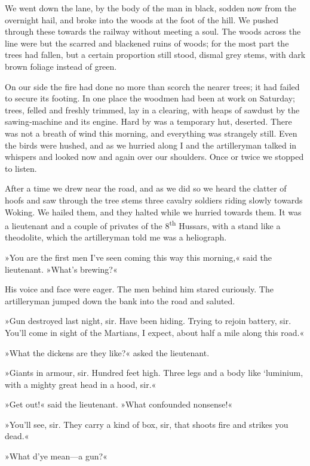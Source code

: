 We went down the lane, by the body of the man in black, sodden now from the overnight hail, and broke into the woods at the foot of the hill. We pushed through these towards the railway without meeting a soul. The woods across the line were but the scarred and blackened ruins of woods; for the most part the trees had fallen, but a certain proportion still stood, dismal grey stems, with dark brown foliage instead of green.

On our side the fire had done no more than scorch the nearer trees; it had failed to secure its footing. In one place the woodmen had been at work on Saturday; trees, felled and freshly trimmed, lay in a clearing, with heaps of sawdust by the sawing-machine and its engine. Hard by was a temporary hut, deserted. There was not a breath of wind this morning, and everything was strangely still. Even the birds were hushed, and as we hurried along I and the artilleryman talked in whispers and looked now and again over our shoulders. Once or twice we stopped to listen.



After a time we drew near the road, and as we did so we heard the clatter of hoofs and saw through the tree stems three cavalry soldiers riding slowly towards Woking. We hailed them, and they halted while we hurried towards them. It was a lieutenant and a couple of privates of the 8\textsuperscript{th} Hussars, with a stand like a theodolite, which the artilleryman told me was a heliograph.

»You are the first men I've seen coming this way this morning,« said the lieutenant. »What's brewing?«

His voice and face were eager. The men behind him stared curiously. The artilleryman jumped down the bank into the road and saluted.

»Gun destroyed last night, sir. Have been hiding. Trying to rejoin battery, sir. You'll come in sight of the Martians, I expect, about half a mile along this road.«

»What the dickens are they like?« asked the lieutenant.

»Giants in armour, sir. Hundred feet high. Three legs and a body like `luminium, with a mighty great head in a hood, sir.«

»Get out!« said the lieutenant. »What confounded nonsense!«

»You'll see, sir. They carry a kind of box, sir, that shoots fire and strikes you dead.«

»What d'ye mean—a gun?«

